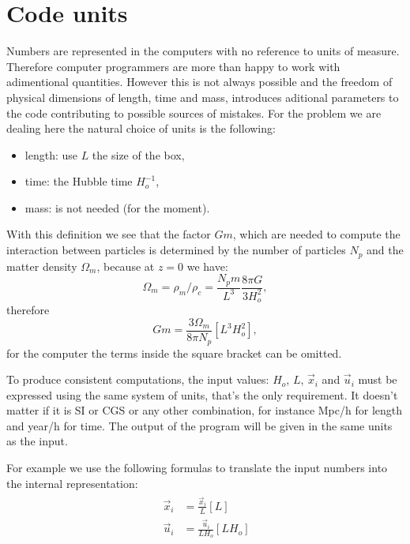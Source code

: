 \section{Code units}

\noindent Numbers are represented in the computers with no reference
to units of measure.
Therefore computer programmers are more than happy to work
with adimentional quantities.
However this is not always possible and the freedom 
of physical dimensions of length, time and mass,
introduces aditional parameters to the code contributing to 
possible sources of mistakes.
For the problem we are dealing here the natural choice of
units is the following:
\begin{itemize}
    \item length: use $L$ the size of the box,
    \item time: the Hubble time $H_o^{-1}$,
    \item mass: is not needed (for the moment).
\end{itemize}

With this definition we see that the factor $Gm$,
which are needed to compute the interaction between particles
is determined by the number of particles $N_p$ and the 
matter density $\Omega_{m}$, because
at $z=0$ we have:
\begin{equation}
    \Omega_m = \rho_m/\rho_c = \frac{ N_p m }{ L^3} \frac{8\pi G}{ 3 H_o^2},
\end{equation}
therefore
\begin{equation}
    Gm = \frac{ 3 \Omega_m }{ 8\pi N_p} [L^3 H_o^2],
\end{equation}
for the computer the terms inside the square bracket can be omitted.

To produce consistent computations, the input values: 
$H_o$, $L$, $\vec x_i$ and $\vec u_i$ must be expressed using the same
system of units, that's the only requirement.
It doesn't matter if it is SI or CGS or any other combination,
for instance Mpc/h for length and year/h for time.
The output of the program will be given in the same units
as the input.

For example we use the following formulas to translate
the input numbers into the internal representation:
\begin{align}\
    \begin{split}
    \vec x_i &= \frac{ \vec x_i }{ L} [L]\\
    \vec u_i &= \frac{ \vec u_i }{ L H_o} [L H_o]\\
    \end{split}
\end{align}


